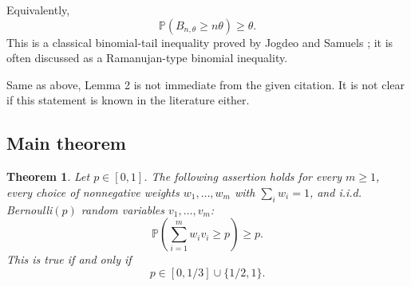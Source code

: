 \documentclass[12pt]{article}
\newtheorem{theorem}{Theorem}
\newcommand{\review}[1]{\begin{reviewbox}#1\end{reviewbox}}
\begin{document}
Equivalently,
\[
\mathbb P(B_{n,\theta}\ge n\theta)\ge \theta .
\]
This is a classical binomial-tail inequality proved by Jogdeo and Samuels
\cite{JogdeoSamuels1968}; it is often discussed as a Ramanujan-type binomial
inequality.

\review{Same as above, Lemma 2 is not immediate from the given citation. It is not clear if this statement is known in the literature either.}

\subsection*{Main theorem}

\begin{theorem}
\label{thm:main}
Let \(p\in[0,1]\). The following assertion holds for every \(m\ge1\), every
choice of nonnegative weights \(w_1,\ldots,w_m\) with \(\sum_i w_i=1\), and
i.i.d. Bernoulli\((p)\) random variables \(v_1,\ldots,v_m\):
\[
\mathbb P\!\left(\sum_{i=1}^m w_i v_i\ge p\right)\ge p.
\]
This is true if and only if
\[
p\in[0,1/3]\cup\{1/2,1\}.
\]
\end{theorem}
\end{document}
